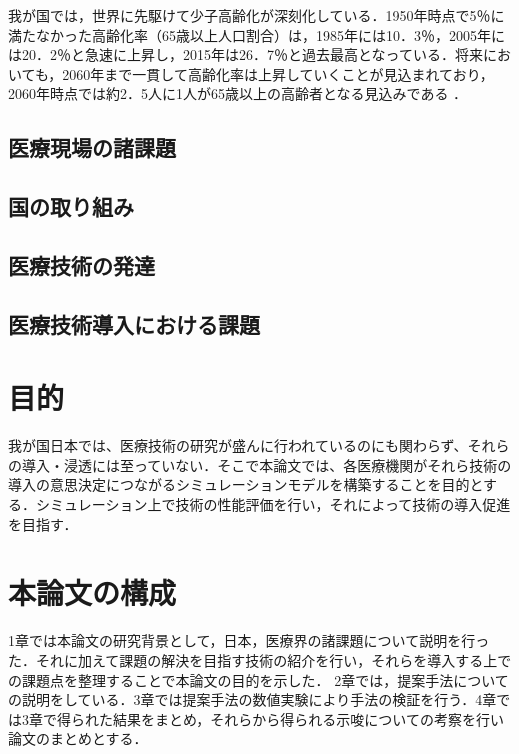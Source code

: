 我が国では，世界に先駆けて少子高齢化が深刻化している．1950年時点で5％に満たなかった高齢化率（65歳以上人口割合）は，1985年には10．3％，2005年には20．2％と急速に上昇し，2015年は26．7％と過去最高となっている．将来においても，2060年まで一貫して高齢化率は上昇していくことが見込まれており，2060年時点では約2．5人に1人が65歳以上の高齢者となる見込みである \cite{ex_kousei_v1}．

\subsection{医療現場の諸課題}

\subsection{国の取り組み}

\subsection{医療技術の発達}

\subsection{医療技術導入における課題}



\section{目的}

我が国日本では、医療技術の研究が盛んに行われているのにも関わらず、それらの導入・浸透には至っていない．そこで本論文では、各医療機関がそれら技術の導入の意思決定につながるシミュレーションモデルを構築することを目的とする．シミュレーション上で技術の性能評価を行い，それによって技術の導入促進を目指す．

\section{本論文の構成}

1章では本論文の研究背景として，日本，医療界の諸課題について説明を行った．それに加えて課題の解決を目指す技術の紹介を行い，それらを導入する上での課題点を整理することで本論文の目的を示した．
2章では，提案手法についての説明をしている．3章では提案手法の数値実験により手法の検証を行う．4章では3章で得られた結果をまとめ，それらから得られる示唆についての考察を行い論文のまとめとする．
